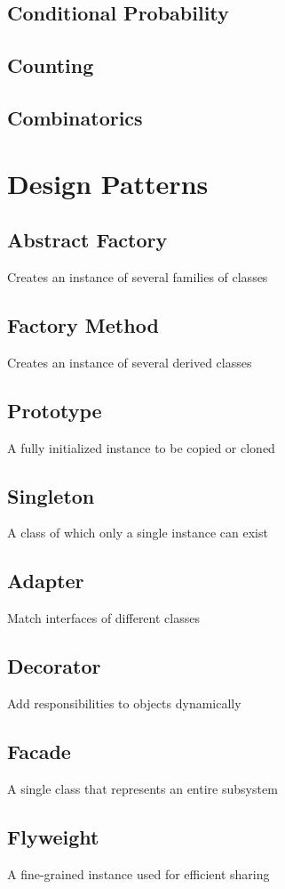 \documentclass{article}
\begin{document}
	\subsection{Conditional Probability}
	\subsection{Counting}
	\subsection{Combinatorics}
\clearpage
\section{Design Patterns}
		\subsection{Abstract Factory}
			Creates an instance of several families of classes
		\subsection{Factory Method}
			Creates an instance of several derived classes
		\subsection{Prototype}
			A fully initialized instance to be copied or cloned
		\subsection{Singleton}
			A class of which only a single instance can exist
		\subsection{Adapter}
			Match interfaces of different classes
		\subsection{Decorator}
			Add responsibilities to objects dynamically
		\subsection{Facade}
			A single class that represents an entire subsystem
		\subsection{Flyweight}
			A fine-grained instance used for efficient sharing
\end{document}
